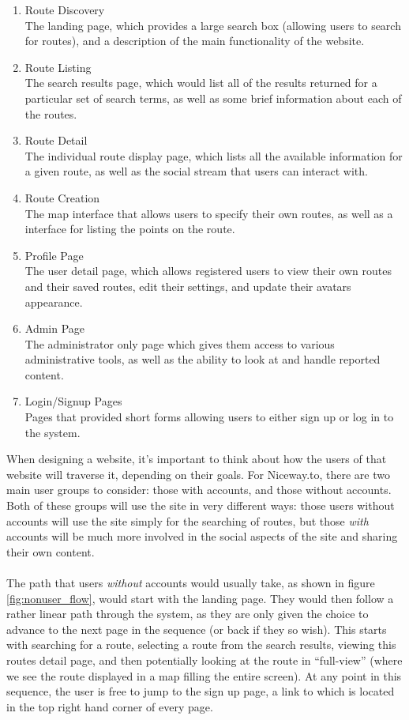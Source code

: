 \begin{enumerate}
	\item Route Discovery \ \\
	The landing page, which provides a large search box (allowing users to search for routes), and a description of the main functionality of the website.
	\item Route Listing \ \\
	The search results page, which would list all of the results returned for a particular set of search terms, as well as some brief information about each of the routes.
	\item Route Detail\ \\
	The individual route display page, which lists all the available information for a given route, as well as the social stream that users can interact with.
	\item Route Creation\ \\
	The map interface that allows users to specify their own routes, as well as a interface for listing the points on the route.
	\item Profile Page\ \\
	The user detail page, which allows registered users to view their own routes and their saved routes, edit their settings, and update their avatars appearance.
	\item Admin Page\ \\
	The administrator only page which gives them access to various administrative tools, as well as the ability to look at and handle reported content.
	\item Login/Signup Pages\ \\
	Pages that provided short forms allowing users to either sign up or log in to the system.
\end{enumerate}
\noindent 
When designing a website, it's important to think about how the users of that website will traverse it, depending on their goals. For Niceway.to, there are two main user groups to consider: those with accounts, and those without accounts. Both of these groups will use the site in very different ways: those users without accounts will use the site simply for the searching of routes, but those \emph{with} accounts will be much more involved in the social aspects of the site and sharing their own content.\ \\
\ \\
The path that users \emph{without} accounts would usually take, as shown in figure \ref{fig:nonuser_flow}, would start with the landing page. They would then follow a rather linear path through the system, as they are only given the choice to advance to the next page in the sequence (or back if they so wish). This starts with searching for a route, selecting a route from the search results, viewing this routes detail page, and then potentially looking at the route in ``full-view'' (where we see the route displayed in a map filling the entire screen). At any point in this sequence, the user is free to jump to the sign up page, a link to which is located in the top right hand corner of every page.


